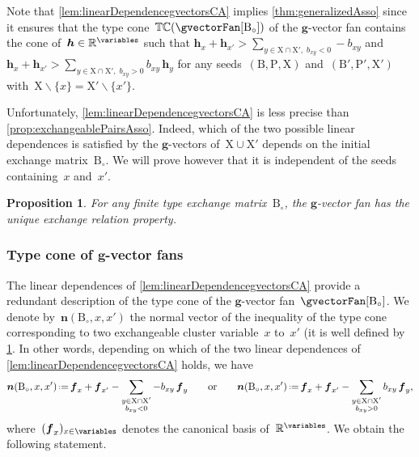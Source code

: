 \documentclass{amsart}
\newtheorem{proposition}[theorem]{Proposition}
\theoremstyle{definition}
\newcommand{\R}{\mathbb{R}} %
\renewcommand{\b}[1]{{\boldsymbol{#1}}} %
\newcommand{\ssm}{\smallsetminus} %
\newcommand{\eqdef}{\mbox{\,\raisebox{0.2ex}{\scriptsize\ensuremath{\mathrm:}}\ensuremath{=}\,}} %
\newcommand{\typeCone}{\mathbb{TC}} %
\newcommand{\cluster}{\mathrm{X}} %
\newcommand{\coefficients}{\mathrm{P}} %
\newcommand{\B}{\mathrm{B}} %
\begin{document}
Note that \cref{lem:linearDependencegvectorsCA} implies \cref{thm:generalizedAsso} since it ensures that the type cone~$\typeCone(\gvectorFan[\B_\circ])$ of the $\b{g}$-vector fan contains the cone of~${\b{h} \in \R^{\variables}}$ such that
\(
\b{h}_x + \b{h}_{x'} > \sum_{{y \in \cluster \cap \cluster', \; b_{xy} < 0}} -b_{xy}
\)
and
\(
\b{h}_x + \b{h}_{x'} > \sum_{{y \in \cluster \cap \cluster', \; b_{xy} > 0}} b_{xy} \, \b{h}_y
\)
for any seeds~$(\B, \coefficients, \cluster)$ and~$(\B', \coefficients', \cluster')$ with~${\cluster \ssm \{x\} = \cluster' \ssm \{x'\}}$.

Unfortunately, \cref{lem:linearDependencegvectorsCA} is less precise than \cref{prop:exchangeablePairsAsso}. Indeed, which of the two possible linear dependences is satisfied by the $\b{g}$-vectors of~$\cluster \cup \cluster'$ depends on the initial exchange matrix~$\B_\circ$.
We will prove however that it is independent of the seeds containing~$x$ and~$x'$.

\begin{proposition}
\label{prop:uniqueExchangePropertyCA}
For any finite type exchange matrix~$\B_\circ$, the $\b{g}$-vector fan has the unique exchange relation property.
\end{proposition}

\subsubsection{Type cone of $\b{g}$-vector fans}

The linear dependences of \cref{lem:linearDependencegvectorsCA} provide a redundant description of the type cone of the $\b{g}$-vector fan~$\gvectorFan[\B_\circ]$.
We denote by~$\b{n}(\B_\circ, x, x')$ the normal vector of the inequality of the type cone corresponding to two exchangeable cluster variable~$x$ to~$x'$ (it is well defined by \cref{prop:uniqueExchangePropertyCA}.
In other words, depending on which of the two linear dependences of \cref{lem:linearDependencegvectorsCA} holds, we have
\[
\b{n}(\B_\circ, x, x') \eqdef \b{f}_x + \b{f}_{x'} - \sum_{\substack{y \in \cluster \cap \cluster' \\ b_{xy} < 0}} -b_{xy} \, \b{f}_y
\qquad\text{or}\qquad
\b{n}(\B_\circ, x, x') \eqdef \b{f}_x + \b{f}_{x'} - \sum_{\substack{y \in \cluster \cap \cluster' \\ b_{xy} > 0}} b_{xy} \, \b{f}_y,
\]
where~$(\b{f}_x)_{x \in \variables}$ denotes the canonical basis of~$\R^{\variables}$.
We obtain the following statement.
\end{document}
